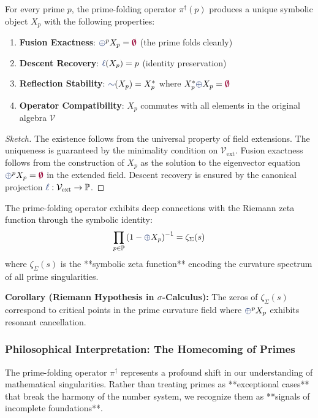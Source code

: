 \begin{theorem}
For every prime $p$, the prime-folding operator $\pi^\dagger(p)$ produces a unique symbolic object $X_p$ with the following properties:
\begin{enumerate}
    \item \textbf{Fusion Exactness}: $\fuse^p X_p = \void$ (the prime folds cleanly)
    \item \textbf{Descent Recovery}: $\lha(X_p) = p$ (identity preservation)
    \item \textbf{Reflection Stability}: $\reflec(X_p) = X_p^*$ where $X_p^* \fuse X_p = \void$
    \item \textbf{Operator Compatibility}: $X_p$ commutes with all elements in the original algebra $\mathcal{V}$
\end{enumerate}
\end{theorem}

\begin{proof}[Sketch]
The existence follows from the universal property of field extensions. The uniqueness is guaranteed by the minimality condition on $\mathcal{V}_{\text{ext}}$. Fusion exactness follows from the construction of $X_p$ as the solution to the eigenvector equation $\fuse^p X_p = \void$ in the extended field. Descent recovery is ensured by the canonical projection $\lha: \mathcal{V}_{\text{ext}} \to \mathbb{P}$.
\end{proof}

\begin{theorem}
The prime-folding operator exhibits deep connections with the Riemann zeta function through the symbolic identity:
\[ \prod_{p \in \mathbb{P}} \left(1 - \fuse X_p\right)^{-1} = \zeta_\Sigma(s) \]
where $\zeta_\Sigma(s)$ is the **symbolic zeta function** encoding the curvature spectrum of all prime singularities.
\end{theorem}

\textbf{Corollary (Riemann Hypothesis in $\sigma$-Calculus):} The zeros of $\zeta_\Sigma(s)$ correspond to critical points in the prime curvature field where $\fuse^p X_p$ exhibits resonant cancellation.

\subsubsection{Philosophical Interpretation: The Homecoming of Primes}
The prime-folding operator $\pi^\dagger$ represents a profound shift in our understanding of mathematical singularities. Rather than treating primes as **exceptional cases** that break the harmony of the number system, we recognize them as **signals of incomplete foundations**.


